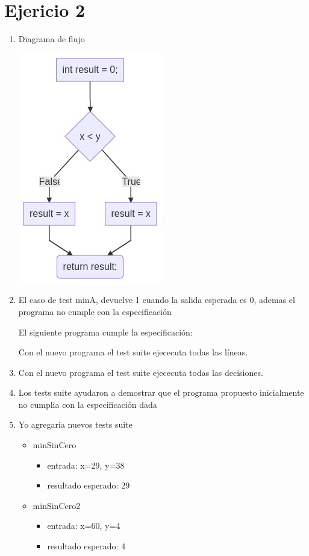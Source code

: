\documentclass{article}
\begin{document}
\section*{Ejericio 2}

\begin{enumerate}
    \item Diagrama de flujo

    \quad\includegraphics[scale=0.65]{./recursos/min.png}

    \item El caso de test minA, devuelve 1 cuando la salida esperada es 0, ademas el programa no cumple con la especificación

    El siguiente programa cumple la especificación:

    

    Con el nuevo programa el test suite ejececuta todas las líneas.

    \item Con el nuevo programa el test suite ejececuta todas las decisiones.

    \item Los tests suite ayudaron a demostrar que el programa propuesto inicialmente no cumplia con la especificación dada

    \item Yo agregaria nuevos tests suite

    \begin{itemize}
        \item minSinCero
        \begin{itemize}
            \item entrada: x=29, y=38
            \item resultado esperado: 29
        \end{itemize}
        \item minSinCero2
        \begin{itemize}
            \item entrada: x=60, y=4
            \item resultado esperado: 4
        \end{itemize}
    \end{itemize}

\end{enumerate}
\end{document}
